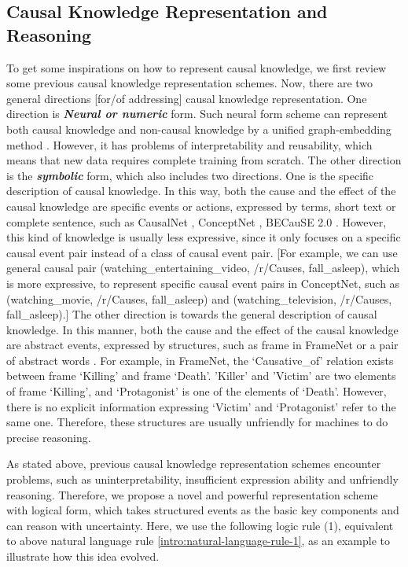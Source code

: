 \subsection{Causal Knowledge Representation and Reasoning}
To get some inspirations on how to represent causal knowledge, we first review some previous causal knowledge representation schemes. Now, there are two general directions [for/of addressing] causal knowledge representation. 
One direction is \textbf{\textit{Neural or numeric}} form. Such neural form scheme can represent both causal knowledge and non-causal knowledge by a unified graph-embedding method \cite{Li2016a,Bordes}. However, it has problems of interpretability and reusability, which means that new data requires complete training from scratch.
The other direction is the \textbf{\textit{symbolic}} form, which also includes two directions. One is the specific description of causal knowledge. In this way, both the cause and the effect of the causal knowledge are specific events or actions, expressed by terms, short text or complete sentence, such as CausalNet \cite{Luo2016a}, ConceptNet \cite{Speer2016}, BECauSE 2.0 \cite{Dunietz2017}. However, this kind of knowledge is usually less expressive, since it only focuses on a specific causal event pair instead of a class of causal event pair. [For example, we can use general causal pair (watching\_entertaining\_video, /r/Causes, fall\_asleep), which is more expressive, to represent specific causal event pairs in ConceptNet, such as (watching\_movie, /r/Causes, fall\_asleep) and (watching\_television, /r/Causes, fall\_asleep).] The other direction is towards the general description of causal knowledge. In this manner, both the cause and the effect of the causal knowledge are abstract events, expressed by structures, such as frame in FrameNet \cite{BakerCollinFandFillmoreCharlesJandLowe1997} or a pair of abstract words \cite{Zhao2017}.
For example, in FrameNet, the `Causative\_of' relation exists between frame `Killing' and frame `Death'. 'Killer' and 'Victim' are two elements of frame `Killing', and `Protagonist' is one of the elements of `Death'. However, there is no explicit information expressing `Victim' and `Protagonist' refer to the same one. Therefore, these structures are usually unfriendly for machines to do precise reasoning.

As stated above, previous causal knowledge representation schemes encounter problems, such as uninterpretability, insufficient expression ability and unfriendly reasoning.
Therefore, we propose a novel and powerful representation scheme with logical form, which takes structured events as the basic key components and can reason with uncertainty. 
Here, we use the following logic rule (1), equivalent to above natural language rule \ref{intro:natural-language-rule-1}, as an example to illustrate how this idea evolved. 

